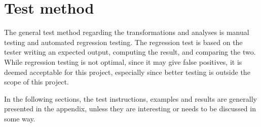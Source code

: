 
\section{Test method}

The general test method regarding the transformations and analyses
is manual testing and automated regression testing. The regression
test is based on the tester writing an expected output, computing the
result, and comparing the two. While regression testing is not optimal,
since it may give false positives, it is deemed acceptable for this
project, especially since better testing is outside the scope of this
project.

In the following sections, the test instructions, examples and results
are generally presented in the appendix, unless they are interesting or
needs to be discussed in some way.

